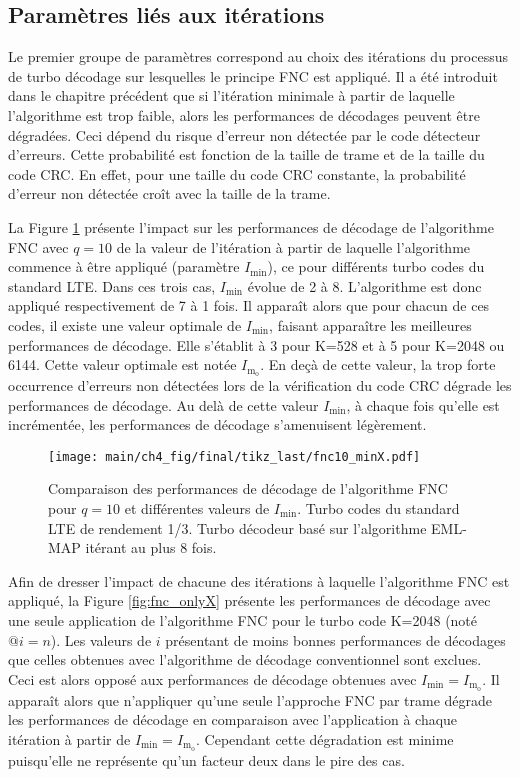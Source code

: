 \subsection{Paramètres liés aux itérations}
Le premier groupe de paramètres correspond au choix des itérations du processus de turbo décodage sur lesquelles le 
principe FNC est appliqué. Il a été introduit dans le chapitre précédent que si l'itération minimale à partir de 
laquelle l'algorithme est trop faible, alors les performances de décodages peuvent être dégradées. Ceci dépend du risque 
d'erreur non détectée par le code détecteur d'erreurs. Cette probabilité est fonction de la taille de trame et de la 
taille du code CRC. En effet, pour une taille du code CRC constante, la probabilité d'erreur non détectée croît avec la
taille de la trame. 

La Figure \ref{fig:fnc_minX} présente l'impact sur les performances de décodage de l'algorithme FNC avec $q=10$ de la 
valeur de l'itération à partir de laquelle l'algorithme commence à être appliqué (paramètre $I_\text{min}$), ce pour 
différents turbo codes du standard LTE. Dans ces trois cas, $I_\text{min}$ évolue de 2 à 8. L'algorithme est donc 
appliqué respectivement de 7 à 1 fois. Il apparaît alors que pour chacun de ces codes, il existe une valeur optimale de 
$I_\text{min}$, faisant apparaître les meilleures performances de décodage. Elle s'établit à 3 pour K=528 et à 5 pour 
K=2048 ou 6144. Cette valeur optimale est notée $I_{\text{m}_\text{o}}$. En deçà de cette valeur, la trop forte occurrence 
d'erreurs non détectées lors de la vérification du 
code CRC dégrade les performances de décodage. Au delà de cette valeur $I_\text{min}$, à chaque fois qu'elle est 
incrémentée, les performances de décodage s'amenuisent légèrement.

\begin{figure}[!h]
	\centering 
	\hspace*{-.075\textwidth}
	\texttt{[image: main/ch4\_fig/final/tikz\_last/fnc10\_minX.pdf]}
	\caption{Comparaison des performances de décodage de l'algorithme FNC pour $q=10$ et différentes valeurs de 
	$I_\text{min}$. Turbo codes du standard LTE de rendement 1/3. 
	Turbo décodeur basé sur l'algorithme EML-MAP itérant au plus 8 fois.
	\label{fig:fnc_minX}}
\end{figure}

Afin de dresser l'impact de chacune des itérations à laquelle l’algorithme FNC est appliqué, la Figure 
\ref{fig:fnc_onlyX} présente les performances de décodage avec une seule application de l'algorithme FNC pour le 
turbo code K=2048 (noté $@i=n$). Les valeurs de $i$ présentant de moins bonnes performances de décodages que celles 
obtenues avec l'algorithme de décodage conventionnel sont exclues. Ceci est alors opposé aux performances de décodage 
obtenues avec $I_\text{min} = I_{\text{m}_\text{o}}$. Il apparaît alors que n'appliquer qu'une seule l'approche FNC par 
trame dégrade les performances de décodage en comparaison avec l’application à chaque itération à partir de $I_\text{min}
 = I_{\text{m}_\text{o}}$. Cependant cette dégradation est minime puisqu'elle ne représente qu'un facteur deux dans le 
 pire des cas.

